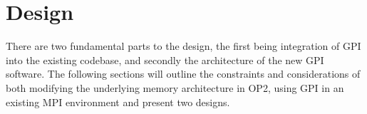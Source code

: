 \chapter{Design}
There are two fundamental parts to the design, the first being integration of GPI into the existing codebase, and secondly the architecture of the new GPI software. The following sections will outline the constraints and considerations of both modifying the underlying memory architecture in OP2, using GPI in an existing MPI environment and present two designs. 




